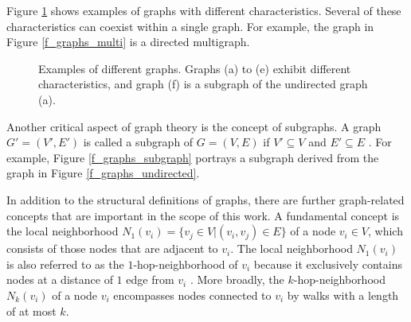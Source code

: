 Figure \ref{f_graphs} shows examples of graphs with different characteristics. Several of these characteristics can coexist within a single graph. For example, the graph in Figure \ref{f_graphs_multi} is a directed multigraph.

\begin{figure}[ht]
        
    \caption{Examples of different graphs. Graphs (a) to (e) exhibit different characteristics, and graph (f) is a subgraph of the undirected graph (a).}
    \label{f_graphs}
\end{figure}

Another critical aspect of graph theory is the concept of subgraphs. A graph $G' = (V', E')$ is called a subgraph of $G = (V,E)$ if $V' \subseteq V$ and $E' \subseteq E$ \cite{diestel_graph_2017}. For example, Figure \ref{f_graphs_subgraph} portrays a subgraph derived from the graph in Figure \ref{f_graphs_undirected}. 

In addition to the structural definitions of graphs, there are further graph-related concepts that are important in the scope of this work. A fundamental concept is the local neighborhood $N_1(v_i) = \{v_j \in V | (v_i, v_j) \in E\}$ of a node $v_i \in V$, which consists of those nodes that are adjacent to $v_i$.
The local neighborhood $N_1(v_i)$ is also referred to as the $1$-hop-neighborhood of $v_i$ because it exclusively contains nodes at a distance of $1$ edge from $v_i$ \cite{bronstein_geometric_2021}. More broadly, the $k$-hop-neighborhood $N_k(v_i)$ of a node $v_i$ encompasses nodes connected to $v_i$ by walks with a length of at most $k$. 



